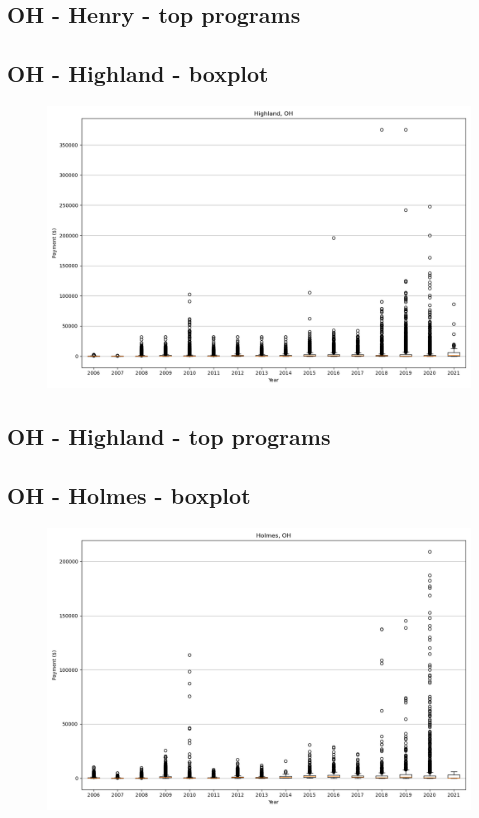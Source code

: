\subsection*{OH - Henry - top programs}

\newpage
\subsection*{OH - Highland - boxplot}
\begin{figure}[h]
\centering
\includegraphics[width=7in]{../output/boxplots/counties/Highland-OH_boxplot.png}
\end{figure}


\subsection*{OH - Highland - top programs}

\newpage
\subsection*{OH - Holmes - boxplot}
\begin{figure}[h]
\centering
\includegraphics[width=7in]{../output/boxplots/counties/Holmes-OH_boxplot.png}
\end{figure}


